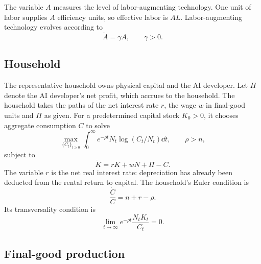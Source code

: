 The variable $A$ measures the level of labor-augmenting technology. One unit of labor supplies $A$ efficiency units, so effective labor is $AL$. Labor-augmenting technology evolves according to
\begin{equation}
 \dot A=\gamma A,
 \qquad \gamma>0.
 \label{eq:rewrite-labor-productivity}
\end{equation}

\subsection{Household}
\label{subsec:rewrite-household}

The representative household owns physical capital and the AI developer. Let \(\Pi\) denote the AI developer's net profit, which accrues to the household. The household takes the paths of the net interest rate \(r\), the wage \(w\) in final-good units and \(\Pi\) as given. For a predetermined capital stock $K_0>0$, it chooses aggregate consumption $C$ to solve
\begin{equation}
 \max_{\{C_t\}_{t\geq0}}
 \int_0^\infty e^{-\rho t}N_t\log(C_t/N_t)\dd t,
 \qquad \rho>n,
 \label{eq:rewrite-household-problem}
\end{equation}
subject to
\begin{equation}
 \dot K=rK+wN+\Pi-C.
 \label{eq:rewrite-household-budget}
\end{equation}
The variable $r$ is the net real interest rate: depreciation has already been deducted from the rental return to capital. The household's Euler condition is
\begin{equation}
 \frac{\dot C}{C}=n+r-\rho.
 \label{eq:rewrite-euler}
\end{equation}
Its transversality condition is
\begin{equation}
 \lim_{t\to\infty}e^{-\rho t}\frac{N_tK_t}{C_t}=0.
 \label{eq:rewrite-household-tvc}
\end{equation}

\subsection{Final-good production}
\label{subsec:rewrite-final-production}

